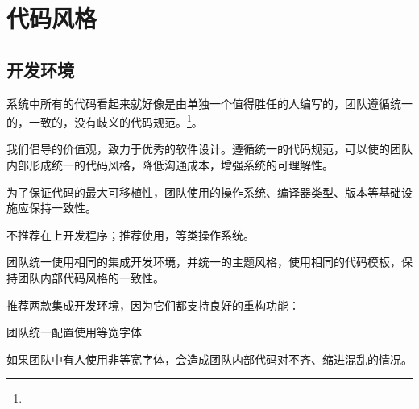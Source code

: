 \begin{savequote}[45mm]
\end{savequote}

\chapter{代码风格} 
\label{ch:coding-style}

\section{开发环境}

\begin{content}

\begin{regulation}
系统中所有的代码看起来就好像是由单独一个值得胜任的人编写的，团队遵循统一的，一致的，没有歧义的代码规范。\footnote{}。
\end{regulation}

我们倡导的价值观，致力于优秀的软件设计。遵循统一的代码规范，可以使的团队内部形成统一的代码风格，降低沟通成本，增强系统的可理解性。

\begin{regulation}
为了保证代码的最大可移植性，团队使用的操作系统、编译器类型、版本等基础设施应保持一致性。
\end{regulation}

不推荐在上开发程序；推荐使用，等类操作系统。

\begin{regulation}
团队统一使用相同的集成开发环境，并统一的主题风格，使用相同的代码模板，保持团队内部代码风格的一致性。
\end{regulation}

推荐两款集成开发环境，因为它们都支持良好的重构功能：
\begin{enum}
\end{enum}

\begin{regulation}
团队统一配置使用等宽字体
\end{regulation}

如果团队中有人使用非等宽字体，会造成团队内部代码对不齐、缩进混乱的情况。


\end{content}
